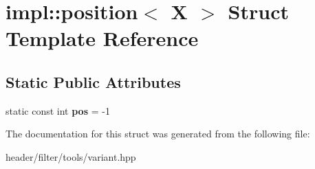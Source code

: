\hypertarget{structimpl_1_1position_3_01_x_01_4}{}\section{impl\+:\+:position$<$ X $>$ Struct Template Reference}
\label{structimpl_1_1position_3_01_x_01_4}
\subsection*{Static Public Attributes}
\begin{DoxyCompactItemize}
\item 
\mbox{\label{structimpl_1_1position_3_01_x_01_4_a97a766b8b68d4de48cf9f864a7ce9a01}} 
static const int {\bfseries pos} = -\/1
\end{DoxyCompactItemize}


The documentation for this struct was generated from the following file\+:\begin{DoxyCompactItemize}
\item 
header/filter/tools/variant.\+hpp\end{DoxyCompactItemize}

